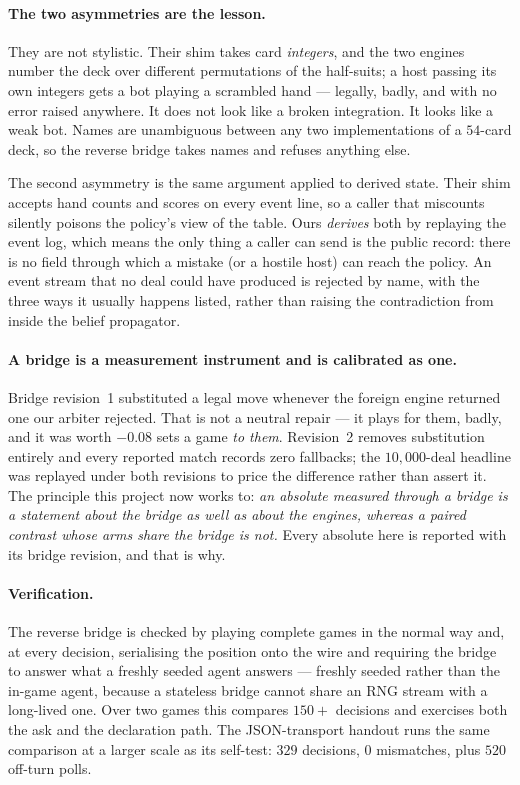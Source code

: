 \documentclass[11pt,letterpaper]{article}
\begin{document}
\paragraph{The two asymmetries are the lesson.} They are not stylistic. Their
shim takes card \emph{integers}, and the two engines number the deck over
different permutations of the half-suits; a host passing its own integers gets
a bot playing a scrambled hand --- legally, badly, and with no error raised
anywhere. It does not look like a broken integration. It looks like a weak
bot. Names are unambiguous between any two implementations of a $54$-card deck,
so the reverse bridge takes names and refuses anything else.

The second asymmetry is the same argument applied to derived state. Their shim
accepts hand counts and scores on every event line, so a caller that miscounts
silently poisons the policy's view of the table. Ours \emph{derives} both by
replaying the event log, which means the only thing a caller can send is the
public record: there is no field through which a mistake (or a hostile host)
can reach the policy. An event stream that no deal could have produced is
rejected by name, with the three ways it usually happens listed, rather than
raising the contradiction from inside the belief propagator.

\paragraph{A bridge is a measurement instrument and is calibrated as one.}
Bridge revision~1 substituted a legal move whenever the foreign engine returned
one our arbiter rejected. That is not a neutral repair --- it plays for them,
badly, and it was worth $-0.08$ sets a game \emph{to them}. Revision~2
removes substitution entirely and every reported match records zero fallbacks;
the $10{,}000$-deal headline was replayed under both revisions to price the
difference rather than assert it. The principle this project now works to:
\emph{an absolute measured through a bridge is a statement about the bridge as
well as about the engines, whereas a paired contrast whose arms share the
bridge is not.} Every absolute here is reported with its bridge revision, and
that is why.

\paragraph{Verification.} The reverse bridge is checked by playing complete
games in the normal way and, at every decision, serialising the position onto
the wire and requiring the bridge to answer what a freshly seeded agent
answers --- freshly seeded rather than the in-game agent, because a stateless
bridge cannot share an RNG stream with a long-lived one. Over two games this
compares $150+$ decisions and exercises both the ask and the declaration path.
The JSON-transport handout runs the same comparison at a larger scale as its
self-test: $329$ decisions, $0$ mismatches, plus $520$ off-turn polls.
\end{document}
